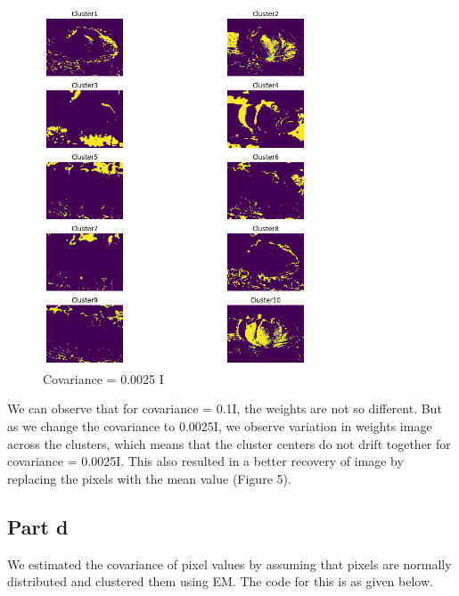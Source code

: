 \documentclass{article}      %
\begin{document}
\begin{figure}[H]
\centering
\includegraphics[width=0.7\textwidth]{fish_wts_partc_400}
\caption{Covariance = 0.0025 I}
\end{figure}

We can observe that for covariance = 0.1I, the weights are not so different. But as we change the covariance to 0.0025I, we observe variation in weights image across the clusters, which means that the cluster centers do not drift together for covariance = 0.0025I. This also resulted in a better recovery of image by replacing the pixels with the mean value (Figure 5).

\subsection{Part d}

We estimated the covariance of pixel values by assuming that pixels are normally distributed and clustered them using EM. The code for this is as given below.
\end{document}
